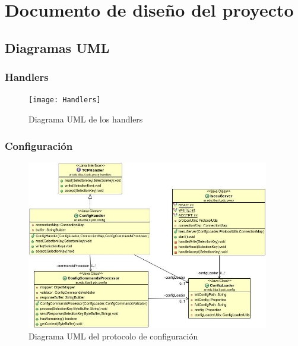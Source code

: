 \documentclass[a4paper,10pt]{article}
\begin{document}
\section{Documento de diseño del proyecto}

\subsection{Diagramas UML}
\subsubsection{Handlers}
\begin{figure}[h]
	\centering
	\texttt{[image: Handlers]}  
	\caption{Diagrama UML de los handlers}
	\label{figure:Handlers}
\end{figure}

\subsubsection{Configuración}
\begin{figure}[h]
	\centering
	\includegraphics[width=400px]{ConfigUML}  
	\caption{Diagrama UML del protocolo de configuración}
	\label{figure:ConfigUML}
\end{figure}
\end{document}
